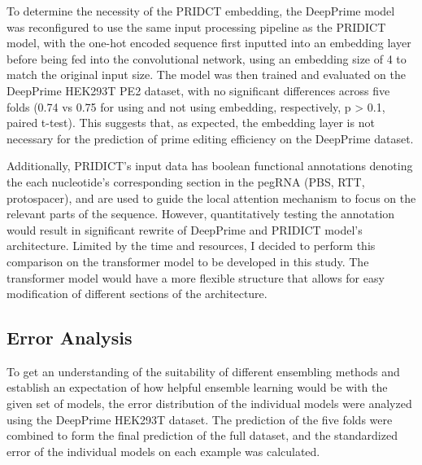 To determine the necessity of the PRIDCT embedding, the DeepPrime model was reconfigured to use the same input processing pipeline as the PRIDICT model, with the one-hot encoded sequence first inputted into an embedding layer before being fed into the convolutional network, using an embedding size of 4 to match the original input size. The model was then trained and evaluated on the DeepPrime HEK293T PE2 dataset, with no significant differences across five folds (0.74 vs 0.75 for using and not using embedding, respectively, p > 0.1, paired t-test). This suggests that, as expected, the embedding layer is not necessary for the prediction of prime editing efficiency on the DeepPrime dataset.

Additionally, PRIDICT's input data has boolean functional annotations denoting the each nucleotide's corresponding section in the pegRNA (PBS, RTT, protospacer), and are used to guide the local attention mechanism to focus on the relevant parts of the sequence. However, quantitatively testing the annotation would result in significant rewrite of DeepPrime and PRIDICT model's architecture. Limited by the time and resources, I decided to perform this comparison on the transformer model to be developed in this study. The transformer model would have a more flexible structure that allows for easy modification of different sections of the architecture. 

\subsection{Error Analysis}

To get an understanding of the suitability of different ensembling methods and establish an expectation of how helpful ensemble learning would be with the given set of models, the error distribution of the individual models were analyzed using the DeepPrime HEK293T dataset. The prediction of the five folds were combined to form the final prediction of the full dataset, and the standardized error of the individual models on each example was calculated.

